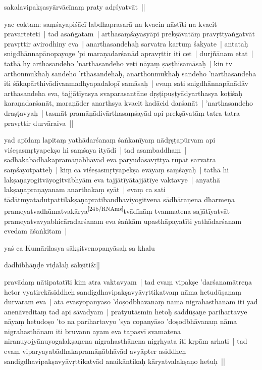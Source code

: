 \documentclass[article,a4paper]{memoir}
\newcommand{\gap}[1]{}
\begin{document}
	
	    \pstart
	   sakalavipakṣasyā\-rvā\-cī\-naṃ praty adṛśyatvā\-t ||
	\pend
      

	  \pstart yac coktam: saṃśayapiśā\-cī\- labdhaprasarā\- na kvacin nā\-stī\-ti na kvacit pravarteteti | tad asaṅgatam | arthasaṃśayasyā\-pi prekṣā\-vatā\-ṃ pravṛttyaṅgatvā\-t pravṛttir avirodhiny eva | anarthasandehaḥ sarvatra kartuṃ śakyate | antataḥ snigdhā\-nnapā\-nopayoge 'pi maraṇadarśanā\-d apravṛttir iti cet | durjñā\-nam etat | tathā\- hy arthasandeho 'narthasandeho veti nā\-yaṃ ṣaṣṭhī\-samā\-saḥ | kin tv arthonmukhaḥ sandeho 'rthasandehaḥ, anarthonmukhaḥ sandeho 'narthasandeha iti śā\-kapā\-rthivā\-divanmadhyapadalopī\- samā\-saḥ | evaṃ sati snigdhā\-nnapā\-nā\-dā\-v arthasandeha eva, tajjā\-tī\-yasya svaparasantā\-ne dṛṣṭipuṣṭyā\-dyarthasya koṭiśaḥ karaṇadarśanā\-t, maraṇā\-der anarthsya kvacit kadā\-cid darśanā\-t |  'narthasandeho draṣṭavyaḥ | tasmā\-t pramā\-ṇā\-divā\-rthasaṃśayā\-d api prekṣā\-vatā\-ṃ tatra tatra pravṛttir durvā\-raiva ||
	\pend
      

	  \pstart yad apī\-daṃ lapitaṃ yathā\-darśanaṃ śaṅkanī\-yaṃ nā\-dṛṣṭapū\-rvam api viśeṣasmṛtyapekṣo hi saṃśaya ityā\-di | tad asambaddhaṃ | sā\-dhakabā\-dhakapramā\-ṇā\-bhā\-vā\-d eva paryudā\-savṛttyā\- rū\-pā\-t sarvatra saṃśayotpatteḥ | kiṃ ca viśeṣasmṛtyapekṣa evā\-yaṃ saṃśayaḥ | tathā\- hi lakṣaṇayogitvā\-yogitvā\-bhyā\-m eva tajjā\-tī\-yā\-tajjā\-tī\-ye vaktavye | anyathā\- lakṣaṇapraṇayanam anarthakaṃ syā\-t | evaṃ ca sati tā\-dā\-tmyatadutpattilakṣaṇapratibandhaviyogitvena sā\-dhā\-raṇena dharmeṇa prameyatvadhū\-matvakā\-rya\leavevmode\textsuperscript{\rmlatinfont\tiny [24b/RNAms]}tvā\-dī\-nā\-ṃ tvanmatena sajā\-tī\-yatvā\-t prameyatvavyabhicā\-radarśanam eva śaṅkā\-m upasthā\-payatī\-ti yathā\-darśanam evedam ā\-śaṅkitam |
	\pend
      

	  \pstart yaś ca Kumā\-rilasya sā\-kṣitvenopanyā\-saḥ sa khalu 
	    \pend
	  
	    
	    \stanza[\smallbreak]
dadhibhā\-ṇḍe viḍā\-laḥ sā\-kṣī\-ti\&[\smallbreak]


	
	    \pstart
	   pravā\-daṃ nā\-tipatatī\-ti kim atra vaktavyam | tad evaṃ vipakṣe 'darśanamā\-treṇa hetor vyatirekā\-siddheḥ sandigdhavipakṣavyā\-vṛttikatvaṃ nā\-ma hetudū\-ṣaṇaṃ durvā\-ram eva | ata evā\-syopanyā\-so 'doṣodbhā\-vanaṃ nā\-ma nigrahasthā\-nam iti yad anenā\-veditaṃ tad api sā\-vadyam | pratyutā\-smin heto\gap{}ḥ saddū\-ṣaṇe parihartavye nā\-yaṃ hetudoṣo 'to na parihartavyo 'sya copanyā\-so 'doṣodbhā\-vanaṃ nā\-ma nigrahasthā\-nam iti bruvann ayam eva tapasvī\- svamatena niranuyojyā\-nuyogalakṣaṇena nigrahasthā\-nena nigṛhyata iti kṛpā\-m arhati | tad evaṃ viparyayabā\-dhakapramā\-ṇā\-bhā\-vā\-d avyā\-pter asiddheḥ sandigdhavipakṣavyā\-vṛttikatvā\-d anaikā\-ntikaḥ kā\-ryatvalakṣaṇo hetuḥ ||
	\pend
      
\end{document}
